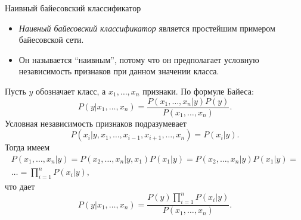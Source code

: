 \documentclass{beamer}
\begin{document}
\begin{frame}{Наивный байесовский классификатор}
    \footnotesize

    \begin{itemize}
        \item \emph{Наивный байесовский классификатор} является простейшим примером байесовской сети.
        \item Он называется ``наивным'', потому что он предполагает условную независимость признаков при данном значении класса.
    \end{itemize}

    Пусть $y$ обозначает класс, а $x_1, \dots, x_n$ признаки. По формуле Байеса:
    \begin{equation}
        P(y | x_1, \dots, x_n) = \frac{P(x_1, \dots, x_n | y) P(y)}{P(x_1, \dots, x_n)}.
    \end{equation}
    Условная независимость признаков подразумевает
    \begin{equation}
        P(x_i | y, x_1, \dots, x_{i-1}, x_{i+1}, \dots, x_n) = P(x_i | y).
    \end{equation}
    Тогда имеем
    \begin{multline}
        P(x_1, \dots, x_n | y) = P(x_2, \dots, x_n | y, x_1) P(x_1 | y) = P(x_2, \dots, x_n | y) P(x_1 | y) = \\
        \dots = \prod_{i = 1}^n P(x_i | y),
    \end{multline}
    что дает
    \begin{equation}
        P(y | x_1, \dots, x_n) = \frac{P(y) \prod_{i = 1}^n P(x_i | y)}{P(x_1, \dots, x_n)}.
    \end{equation}
\end{frame}
\end{document}
